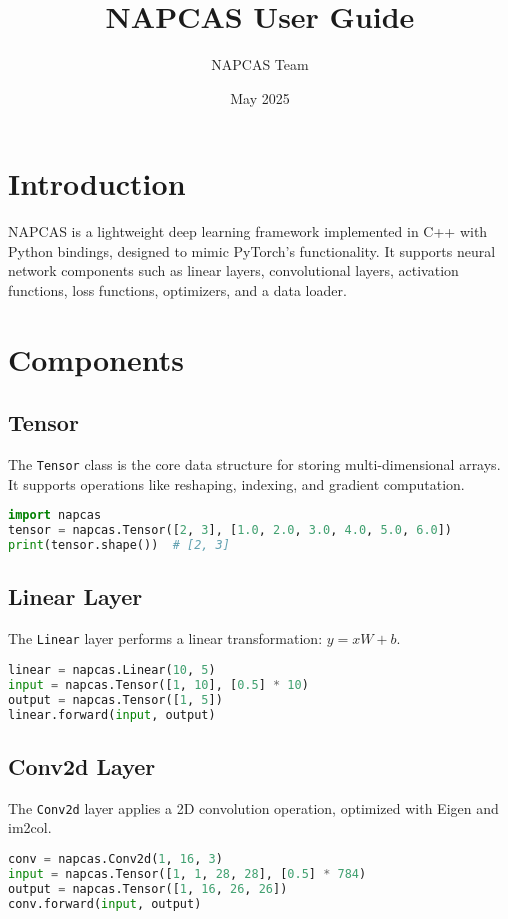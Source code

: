 \documentclass[a4paper,11pt]{article}
\title{NAPCAS User Guide}
\author{NAPCAS Team}
\date{May 2025}
\begin{document}
\maketitle
\tableofcontents
\newpage

\section{Introduction}
NAPCAS is a lightweight deep learning framework implemented in C++ with Python bindings, designed to mimic PyTorch's functionality. It supports neural network components such as linear layers, convolutional layers, activation functions, loss functions, optimizers, and a data loader.

\section{Components}

\subsection{Tensor}
The \texttt{Tensor} class is the core data structure for storing multi-dimensional arrays. It supports operations like reshaping, indexing, and gradient computation.

\begin{lstlisting}[language=Python]
import napcas
tensor = napcas.Tensor([2, 3], [1.0, 2.0, 3.0, 4.0, 5.0, 6.0])
print(tensor.shape())  # [2, 3]
\end{lstlisting}

\subsection{Linear Layer}
The \texttt{Linear} layer performs a linear transformation: $y = xW + b$.

\begin{lstlisting}[language=Python]
linear = napcas.Linear(10, 5)
input = napcas.Tensor([1, 10], [0.5] * 10)
output = napcas.Tensor([1, 5])
linear.forward(input, output)
\end{lstlisting}

\subsection{Conv2d Layer}
The \texttt{Conv2d} layer applies a 2D convolution operation, optimized with Eigen and im2col.

\begin{lstlisting}[language=Python]
conv = napcas.Conv2d(1, 16, 3)
input = napcas.Tensor([1, 1, 28, 28], [0.5] * 784)
output = napcas.Tensor([1, 16, 26, 26])
conv.forward(input, output)
\end{lstlisting}
\end{document}
